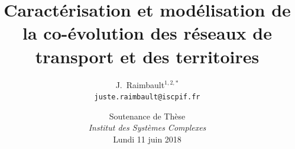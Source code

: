 \documentclass[english,11pt]{beamer}
\begin{document}
\title{Caractérisation et modélisation de la co-évolution des réseaux de transport et des territoires}

\author{J.~Raimbault$^{1,2,\ast}$\\
\texttt{juste.raimbault@iscpif.fr}
}




\date{Soutenance de Thèse\\\smallskip
\textit{Institut des Systèmes Complexes}\\\smallskip
Lundi 11 juin 2018
}

\frame{\maketitle}


% 










%
\end{document}
